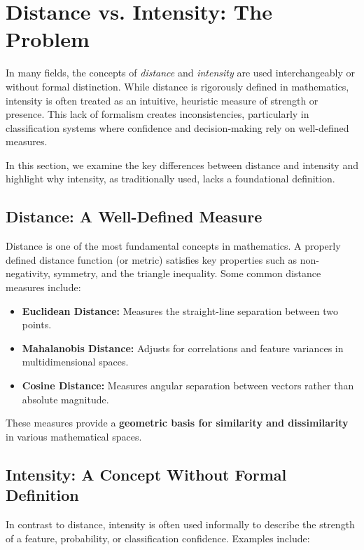 \section{Distance vs. Intensity: The Problem}

In many fields, the concepts of \textit{distance} and \textit{intensity} are used interchangeably or without formal distinction. While distance is rigorously defined in mathematics, intensity is often treated as an intuitive, heuristic measure of strength or presence. This lack of formalism creates inconsistencies, particularly in classification systems where confidence and decision-making rely on well-defined measures.

In this section, we examine the key differences between distance and intensity and highlight why intensity, as traditionally used, lacks a foundational definition.

\subsection{Distance: A Well-Defined Measure}

Distance is one of the most fundamental concepts in mathematics. A properly defined distance function (or metric) satisfies key properties such as non-negativity, symmetry, and the triangle inequality. Some common distance measures include:

\begin{itemize}
    \item \textbf{Euclidean Distance:} Measures the straight-line separation between two points.
    \item \textbf{Mahalanobis Distance:} Adjusts for correlations and feature variances in multidimensional spaces.
    \item \textbf{Cosine Distance:} Measures angular separation between vectors rather than absolute magnitude.
\end{itemize}

These measures provide a \textbf{geometric basis for similarity and dissimilarity} in various mathematical spaces.

\subsection{Intensity: A Concept Without Formal Definition}

In contrast to distance, intensity is often used informally to describe the strength of a feature, probability, or classification confidence. Examples include:

